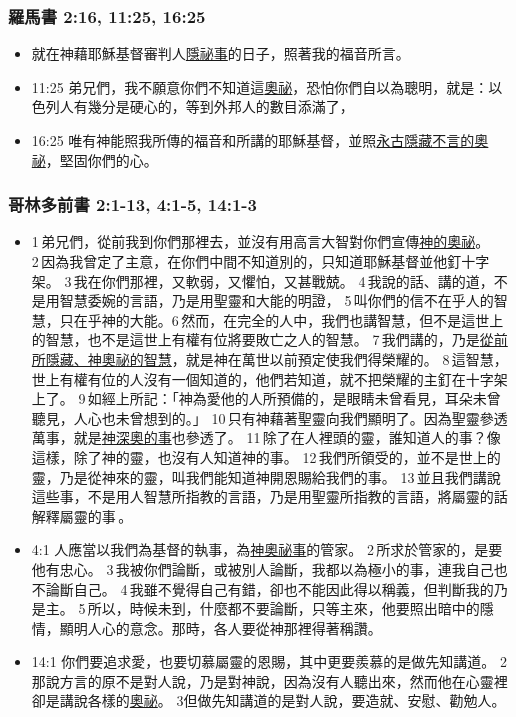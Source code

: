 \subsubsection{羅馬書 2:16, 11:25, 16:25}
\begin{itemize} 
\itemsep-.25em
\item 就在神藉耶穌基督審判人\underline{隱祕事}的日子，照著我的福音所言。
\item 11:25 弟兄們，我不願意你們不知道這\underline{奧祕}，恐怕你們自以為聰明，就是：以色列人有幾分是硬心的，等到外邦人的數目添滿了，
\item 16:25 唯有神能照我所傳的福音和所講的耶穌基督，並照\underline{永古隱藏不言的奧祕}，堅固你們的心。
\end{itemize} 

\subsubsection{哥林多前書 2:1-13, 4:1-5, 14:1-3}
\begin{itemize} 
\itemsep-.25em
\item 1 弟兄們，從前我到你們那裡去，並沒有用高言大智對你們宣傳\underline{神的奧祕}。 2 因為我曾定了主意，在你們中間不知道別的，只知道耶穌基督並他釘十字架。 3 我在你們那裡，又軟弱，又懼怕，又甚戰兢。 4 我說的話、講的道，不是用智慧委婉的言語，乃是用聖靈和大能的明證， 5 叫你們的信不在乎人的智慧，只在乎神的大能。6 然而，在完全的人中，我們也講智慧，但不是這世上的智慧，也不是這世上有權有位將要敗亡之人的智慧。 7 我們講的，乃是\underline{從前所隱藏、神奧祕的智慧}，就是神在萬世以前預定使我們得榮耀的。 8 這智慧，世上有權有位的人沒有一個知道的，他們若知道，就不把榮耀的主釘在十字架上了。 9 如經上所記：「神為愛他的人所預備的，是眼睛未曾看見，耳朵未曾聽見，人心也未曾想到的。」 10 只有神藉著聖靈向我們顯明了。因為聖靈參透萬事，就是\underline{神深奧的事}也參透了。 11 除了在人裡頭的靈，誰知道人的事？像這樣，除了神的靈，也沒有人知道神的事。 12 我們所領受的，並不是世上的靈，乃是從神來的靈，叫我們能知道神開恩賜給我們的事。 13 並且我們講說這些事，不是用人智慧所指教的言語，乃是用聖靈所指教的言語，將屬靈的話解釋屬靈的事 。
\item 4:1 人應當以我們為基督的執事，為\underline{神奧祕事}的管家。 2 所求於管家的，是要他有忠心。 3 我被你們論斷，或被別人論斷，我都以為極小的事，連我自己也不論斷自己。 4 我雖不覺得自己有錯，卻也不能因此得以稱義，但判斷我的乃是主。 5 所以，時候未到，什麼都不要論斷，只等主來，他要照出暗中的隱情，顯明人心的意念。那時，各人要從神那裡得著稱讚。
\item 14:1 你們要追求愛，也要切慕屬靈的恩賜，其中更要羨慕的是做先知講道。 2那說方言的原不是對人說，乃是對神說，因為沒有人聽出來，然而他在心靈裡卻是講說各樣的\underline{奧祕}。 3但做先知講道的是對人說，要造就、安慰、勸勉人。
\end{itemize} 

